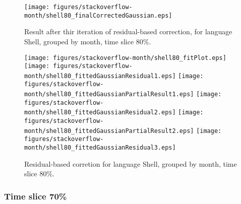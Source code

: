 \begin{figure}[]
\centering
{\texttt{[image: figures/stackoverflow-month/shell80\_finalCorrectedGaussian.eps]}}
\caption{Result after thir iteration of residual-based correction, for language Shell, grouped by month, time slice 80\%.}
\end{figure}


\begin{figure}[hb]
\centering
{}
{\texttt{[image: figures/stackoverflow-month/shell80\_fitPlot.eps]}}
{\texttt{[image: figures/stackoverflow-month/shell80\_fittedGaussianResidual1.eps]}}
{\texttt{[image: figures/stackoverflow-month/shell80\_fittedGaussianPartialResult1.eps]}}
{\texttt{[image: figures/stackoverflow-month/shell80\_fittedGaussianResidual2.eps]}}
{\texttt{[image: figures/stackoverflow-month/shell80\_fittedGaussianPartialResult2.eps]}}
{\texttt{[image: figures/stackoverflow-month/shell80\_fittedGaussianResidual3.eps]}}
\caption{Residual-based corretion for language Shell, grouped by month, time slice 80\%.}
\end{figure}


\clearpage 
\newpage 


\FloatBarrier

\subsubsection{Time slice 70\%}

